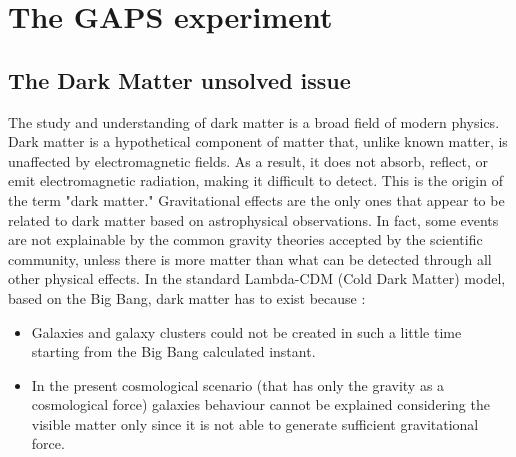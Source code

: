 \chapter{The GAPS experiment} \label{appendixGAPSintro}


\section{The Dark Matter unsolved issue}

The study and understanding of dark matter is a broad field of modern physics. Dark matter is a hypothetical component of matter that, unlike known matter, is unaffected by electromagnetic fields. As a result, it does not absorb, reflect, or emit electromagnetic radiation, making it difficult to detect. This is the origin of the term "dark matter." Gravitational effects are the only ones that appear to be related to dark matter based on astrophysical observations. In fact, some events are not explainable by the common gravity theories accepted by the scientific community, unless there is more matter than what can be detected through all other physical effects. In the standard Lambda-CDM (Cold Dark Matter) model, based on the Big Bang, dark matter has to exist because \cite{aramaki_2016_review}:

\begin{itemize}
    \itemsep0em
    \item Galaxies and galaxy clusters could not be created in such a little time starting from the Big Bang calculated instant.
    \item In the present cosmological scenario (that has only the gravity as a cosmological force) galaxies behaviour cannot be explained considering the visible matter only since it is not able to generate sufficient gravitational force.
\end{itemize}

